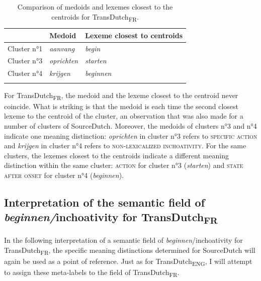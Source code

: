 \begin{table}
\caption{\label{tab:4:16}Comparison of medoids and lexemes closest to the centroids for TransDutch\textsubscript{FR}.}
\begin{tabularx}{\textwidth}{XXl}
\lsptoprule
& Medoid & Lexeme closest to centroids\\
\midrule 
Cluster n°1 & \itshape aanvang   & \itshape begin\\
Cluster n°3 & \itshape oprichten & \itshape starten\\
Cluster n°4 & \itshape krijgen   & \itshape beginnen\\
\lspbottomrule
\end{tabularx}
\end{table}

For TransDutch\textsubscript{FR}, the medoid and the lexeme closest to the centroid never coincide. What is striking is that the medoid is each time the second closest lexeme to the centroid of the cluster, an observation that was also made for a number of clusters of SourceDutch. Moreover, the medoids of clusters n°3 and n°4 indicate one meaning distinction: \textit{oprichten} in cluster n°3 refers to {\textsc{specific}} \textsc{action} and \textit{krijgen} in cluster n°4 refers to {\textsc{non-lexicalized inchoativity}}. For the same clusters, the lexemes closest to the centroids indicate a different meaning distinction within the same cluster: \textsc{action} for cluster n°3 (\textit{starten}) and \textsc{state after onset} for cluster n°4 (\textit{beginnen}).

\subsection{Interpretation of the semantic field of \textit{beginnen/}inchoativity for TransDutch\textsubscript{FR}}
\label{sec:4.4.4}  
In the following interpretation of a semantic field of \textit{beginnen}/inchoativity for TransDutch\textsubscript{FR}, the specific meaning distinctions determined for SourceDutch will again be used as a point of reference. Just as for TransDutch\textsubscript{ENG}, I will attempt to assign these meta-labels to the field of TransDutch\textsubscript{FR}.

